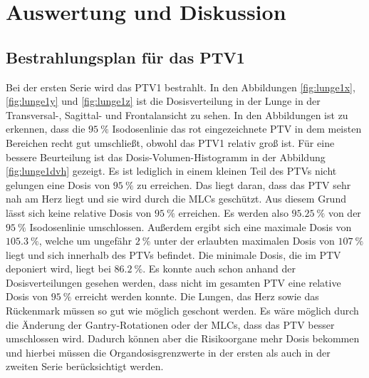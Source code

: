 \section{Auswertung und Diskussion}
\label{sec:AuswertungDiskussion}

\subsection*{Bestrahlungsplan für das PTV1}
Bei der ersten Serie wird das PTV1 bestrahlt. In den Abbildungen \ref{fig:lunge1x}, \ref{fig:lunge1y} und \ref{fig:lunge1z} ist die Dosisverteilung in der Lunge in der
Transversal-, Sagittal- und Frontalansicht zu sehen. In den Abbildungen ist zu erkennen, dass die $\SI{95}{\percent}$ Isodosenlinie das
rot eingezeichnete PTV in dem meisten Bereichen recht gut umschließt, obwohl das PTV1 relativ groß ist.
Für eine bessere Beurteilung ist das Dosis-Volumen-Histogramm in der Abbildung \ref{fig:lunge1dvh} gezeigt.
Es ist lediglich in einem kleinen Teil des PTVs nicht gelungen eine Dosis von $\SI{95}{\percent}$ zu erreichen. Das liegt daran, dass das PTV sehr nah am Herz liegt und sie wird durch die MLCs geschützt. Aus diesem Grund lässt sich keine relative Dosis von $\SI{95}{\percent}$ erreichen. Es werden also $\SI{95,25}{\percent}$ von der $\SI{95}{\percent}$ Isodosenlinie umschlossen.
Außerdem ergibt sich eine maximale Dosis von $\SI{105.3}{\percent}$, welche um ungefähr $\SI{2}{\percent}$ unter der erlaubten maximalen Dosis von $\SI{107}{\percent}$ liegt und sich innerhalb des PTVs befindet. Die minimale Dosis, die im PTV deponiert wird, liegt bei $\SI{86.2}{\percent}$.
Es konnte auch schon anhand der Dosisverteilungen gesehen werden, dass nicht im gesamten PTV eine relative Dosis von $\SI{95}{\percent}$ erreicht werden konnte. Die Lungen, das Herz sowie das Rückenmark müssen so gut wie möglich geschont werden.
Es wäre möglich durch die Änderung der Gantry-Rotationen oder der MLCs, dass das PTV besser umschlossen wird. Dadurch können aber die Risikoorgane mehr Dosis bekommen und hierbei müssen die Organdosisgrenzwerte in der ersten als auch in der zweiten Serie berücksichtigt werden.

